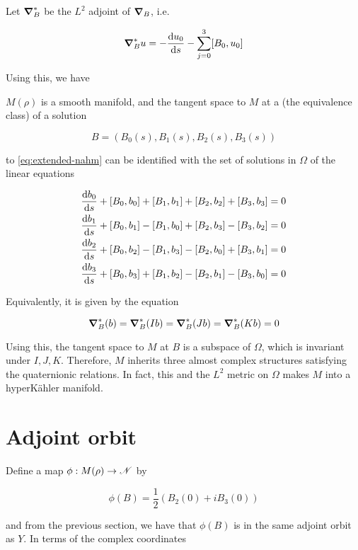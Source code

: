 \documentclass{report}
\begin{document}
Let \(\grad_B^*\) be the \(L^2\) adjoint of \(\grad_B\), i.e.

\[\grad_B^*u = - \dv{u_0}{s} - \sum_{j=0}^3[B_0, u_0]\]

Using this, we have

\begin{proposition}
    \label{prop:tangent-space} \(M(\rho)\) is a smooth manifold, and the tangent space to \(M\) at a (the equivalence class) of a solution 
    
    \[B = (B_0(s), B_1(s), B_2(s), B_3(s))\] 
    
    to \cref{eq:extended-nahm} can be identified with the set of solutions in \(\Omega\) of the linear equations

    \begin{equation}
        \label{eq:tangent-space}
        \begin{split}
            \dv{b_0}{s} + [B_0, b_0] + [B_1, b_1] + [B_2, b_2] + [B_3, b_3] &= 0 \\
            \dv{b_1}{s} + [B_0, b_1] - [B_1, b_0] + [B_2, b_3] - [B_3, b_2] &= 0 \\
            \dv{b_2}{s} + [B_0, b_2] - [B_1, b_3] - [B_2, b_0] + [B_3, b_1] &= 0 \\
            \dv{b_3}{s} + [B_0, b_3] + [B_1, b_2] - [B_2, b_1] - [B_3, b_0] &= 0
        \end{split}
    \end{equation}

    Equivalently, it is given by the equation

    \[\grad^*_B(b) = \grad^*_B(Ib) = \grad^*_B(Jb) = \grad^*_B(Kb) = 0\]
\end{proposition}

Using this, the tangent space to \(M\) at \(B\) is a subspace of \(\Omega\), which is invariant under \(I, J, K\). Therefore, \(M\) inherits three almost complex structures satisfying the quaternionic relations. In fact, this and the \(L^2\) metric on \(\Omega\) makes \(M\) into a hyperK\"ahler manifold.

\section{Adjoint orbit}

Define a map \(\phi : M(\rho) \to \mathscr{N}\) by

\[\phi(B) = \frac12(B_2(0) + iB_3(0))\]

and from the previous section, we have that \(\phi(B)\) is in the same adjoint orbit as \(Y\). In terms of the complex coordinates
\end{document}
